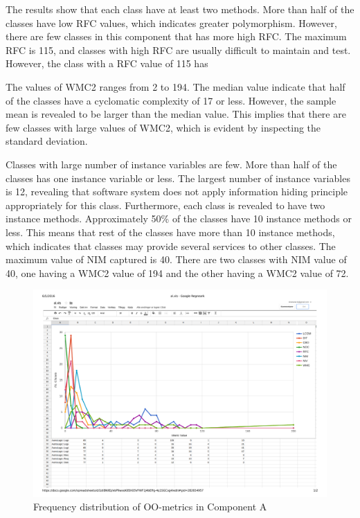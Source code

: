 The results show that each class have at least two methods. More than half of the classes have low RFC values, which indicates greater polymorphism. However, there are few classes in this component that has more high RFC. The maximum RFC is 115, and classes with high RFC are usually difficult to maintain and test. However, the class with a RFC value of 115 has 

The values of WMC2 ranges from 2 to 194. The median value indicate that half of the classes have a cyclomatic complexity of 17 or less. However, the sample mean is revealed to be larger than the median value. This implies that there are few classes with large values of WMC2, which is evident by inspecting the standard deviation.

Classes with large number of instance variables are few. More than half of the classes has one instance variable or less. The largest number of instance variables is 12, revealing that software system does not apply information hiding principle appropriately for this class. Furthermore, each class is revealed to have two instance methods. Approximately 50\% of the classes have 10 instance methods or less. This means that rest of the classes have more than 10 instance methods, which indicates that classes may provide several services to other classes. The maximum value of NIM captured is 40. There are two classes with NIM value of 40, one having a WMC2 value of 194 and the other having a WMC2 value of 72. 




\begin{landscape}
\setlength\LTleft{-.5in}
	\begin{figure}
	\centering
	\includegraphics[width=\textwidth]{images/pdf/al.pdf}
	\caption{Frequency distribution of OO-metrics in Component A}
	\label{fig:algraph}
	\end{figure}
\end{landscape}

